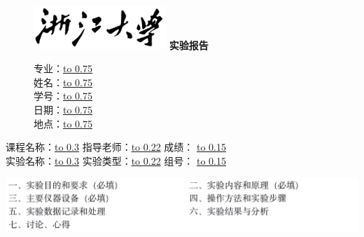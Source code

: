 \documentclass[UTF-8,AutoFakeBold]{article}%
\begin{document}
\begin{figure}[t]
    \centering
    \includegraphics[width=5cm]{image/zjutag.jpg}
    \textbf{\Huge\heiti 实验报告}
    \qquad\qquad
    \parbox[b]{5cm}{
        专业：\underline{\hbox to 0.75\linewidth{\hfill 1 \hfill}}\\

        \vspace{-1.5ex}
        姓名：\underline{\hbox to 0.75\linewidth{\hfill 1 \hfill}}\\

        \vspace{-1.5ex}
        学号：\underline{\hbox to 0.75\linewidth{\hfill 1 \hfill}}\\

        \vspace{-1.5ex}
        日期：\underline{\hbox to 0.75\linewidth{\hfill 1 \hfill}}\\

        \vspace{-1.5ex}
        地点：\underline{\hbox to 0.75\linewidth{\hfill 1 \hfill}}\\
    }
\end{figure}
\vspace{6ex}
\begin{flushleft}
    \parbox{1\linewidth}{
    \centering
    课程名称：\underline{\hbox to  0.3\linewidth{\hfill 1 \hfill}}
    指导老师：\underline{\hbox to 0.22\linewidth{\hfill 1 \hfill}}
    成绩：   \underline{\hbox to 0.15\linewidth{\hfill 1 \hfill}}\\
    实验名称：\underline{\hbox to  0.3\linewidth{\hfill 1 \hfill}}
    实验类型：\underline{\hbox to 0.22\linewidth{\hfill 1 \hfill}}
    组号：   \underline{\hbox to 0.15\linewidth{\hfill 1 \hfill}}\\
    
}
\end{flushleft}


\begin{flushleft} 
    \centering
    \includegraphics[width=1.2\linewidth]{image/zju_content.png}
\end{flushleft}
\vspace*{6ex}
\end{document}
